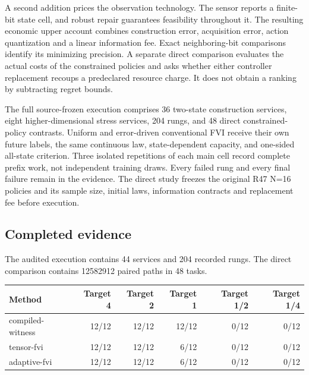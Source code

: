 \documentclass[ecta,nameyear,draft]{econsocart}
\begin{document}
A second addition prices the observation technology. The sensor reports
a finite-bit state cell, and robust repair guarantees feasibility
throughout it. The resulting economic upper account combines
construction error, acquisition error, action quantization and a linear
information fee. Exact neighboring-bit comparisons identify its
minimizing precision. A separate direct comparison evaluates the actual
costs of the constrained policies and asks whether either controller
replacement recoups a predeclared resource charge. It does not obtain a
ranking by subtracting regret bounds.

The full source-frozen execution comprises 36 two-state construction
services, eight higher-dimensional stress services, 204 rungs, and 48
direct constrained-policy contrasts. Uniform and error-driven
conventional FVI receive their own future labels, the same continuous
law, state-dependent capacity, and one-sided all-state criterion. Three
isolated repetitions of each main cell record complete prefix work, not
independent training draws. Every failed rung and every final failure
remain in the evidence. The direct study freezes the original R47 N=16
policies and its sample size, initial laws, information contracts and
replacement fee before execution.

\hypertarget{completed-evidence}{%
\subsection{Completed evidence}\label{completed-evidence}}

The audited execution contains 44 services and 204 recorded rungs. The
direct comparison contains 12582912 paired paths in 48 tasks.

\begin{longtable}[]{@{}lrrrrr@{}}
\toprule\noalign{}
Method & Target 4 & Target 2 & Target 1 & Target 1/2 & Target 1/4 \\
\midrule\noalign{}
\endhead
\bottomrule\noalign{}
\endlastfoot
compiled-witness & 12/12 & 12/12 & 12/12 & 0/12 & 0/12 \\
tensor-fvi & 12/12 & 12/12 & 6/12 & 0/12 & 0/12 \\
adaptive-fvi & 12/12 & 12/12 & 6/12 & 0/12 & 0/12 \\
\end{longtable}
\end{document}
